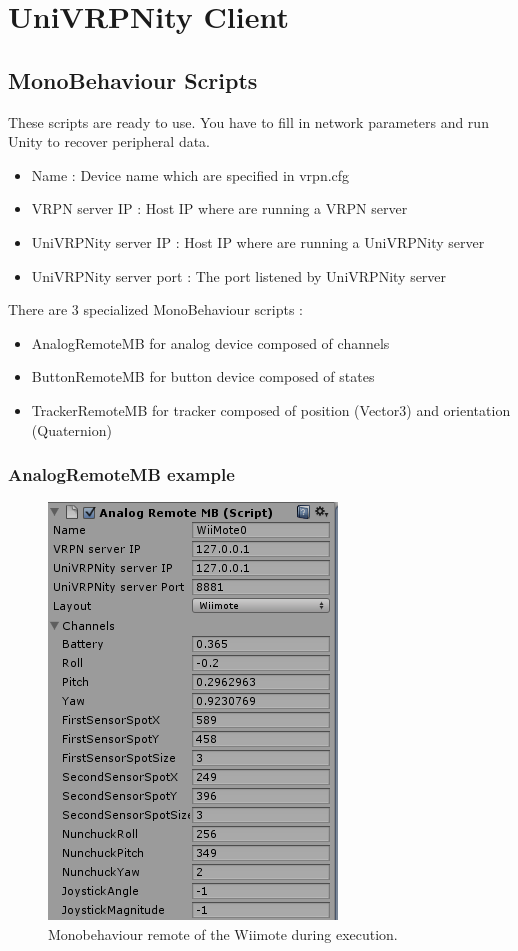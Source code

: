 \documentclass[11pt]{article} %
\begin{document}
\section{UniVRPNity Client}

	\subsection{MonoBehaviour Scripts}
		These scripts are ready to use. You have to fill in network parameters and run Unity to recover peripheral data.
		\begin{itemize}
			\item Name : Device name which are specified in vrpn.cfg
			\item VRPN server IP : Host IP where are running a VRPN server
			\item UniVRPNity server IP : Host IP where are running a UniVRPNity server
			\item UniVRPNity server port : The port listened by UniVRPNity server
		\end{itemize}
				
		There are 3 specialized MonoBehaviour scripts :
		\begin{itemize}
			\item AnalogRemoteMB for analog device composed of channels
			\item ButtonRemoteMB for button device composed of states
			\item TrackerRemoteMB for tracker composed of position (Vector3) and orientation (Quaternion)
		\end{itemize}

		\subsubsection{AnalogRemoteMB example}
	
			\begin{figure}[H]
				\includegraphics{AnalogWiimote.png}
				\caption{Monobehaviour remote of the Wiimote during execution.}
			\end{figure}
\end{document}
